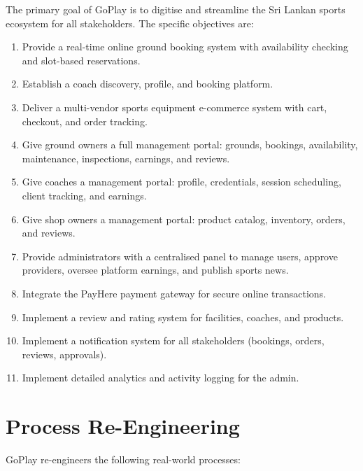 \documentclass[12pt,a4paper]{report}
\begin{document}
The primary goal of GoPlay is to digitise and streamline the Sri Lankan sports ecosystem for all stakeholders. The specific objectives are:

\begin{enumerate}[leftmargin=1.5cm]
  \item Provide a real-time online ground booking system with availability checking and slot-based reservations.
  \item Establish a coach discovery, profile, and booking platform.
  \item Deliver a multi-vendor sports equipment e-commerce system with cart, checkout, and order tracking.
  \item Give ground owners a full management portal: grounds, bookings, availability, maintenance, inspections, earnings, and reviews.
  \item Give coaches a management portal: profile, credentials, session scheduling, client tracking, and earnings.
  \item Give shop owners a management portal: product catalog, inventory, orders, and reviews.
  \item Provide administrators with a centralised panel to manage users, approve providers, oversee platform earnings, and publish sports news.
  \item Integrate the PayHere payment gateway for secure online transactions.
  \item Implement a review and rating system for facilities, coaches, and products.
  \item Implement a notification system for all stakeholders (bookings, orders, reviews, approvals).
  \item Implement detailed analytics and activity logging for the admin.
\end{enumerate}

\section{Process Re-Engineering}

GoPlay re-engineers the following real-world processes:
\end{document}
